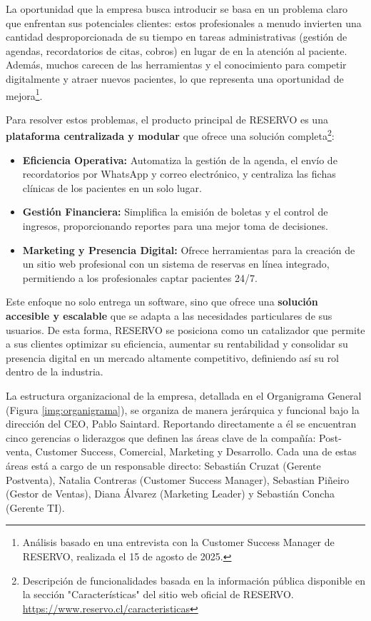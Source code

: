 La oportunidad que la empresa busca introducir se basa en un problema claro que enfrentan sus potenciales clientes: estos profesionales a menudo invierten una cantidad desproporcionada de su tiempo en tareas administrativas (gestión de agendas, recordatorios de citas, cobros) en lugar de en la atención al paciente. Además, muchos carecen de las herramientas y el conocimiento para competir digitalmente y atraer nuevos pacientes, lo que representa una oportunidad de mejora\footnote{Análisis basado en una entrevista con la Customer Success Manager de RESERVO, realizada el 15 de agosto de 2025.}.

Para resolver estos problemas, el producto principal de RESERVO es una \textbf{plataforma centralizada y modular} que ofrece una solución completa\footnote{Descripción de funcionalidades basada en la información pública disponible en la sección "Características" del sitio web oficial de RESERVO. \url{https://www.reservo.cl/caracteristicas}}:

\begin{itemize}
    \item \textbf{Eficiencia Operativa:} Automatiza la gestión de la agenda, el envío de recordatorios por WhatsApp y correo electrónico, y centraliza las fichas clínicas de los pacientes en un solo lugar.
    
    \item \textbf{Gestión Financiera:} Simplifica la emisión de boletas y el control de ingresos, proporcionando reportes para una mejor toma de decisiones.
    
    \item \textbf{Marketing y Presencia Digital:} Ofrece herramientas para la creación de un sitio web profesional con un sistema de reservas en línea integrado, permitiendo a los profesionales captar pacientes 24/7.
\end{itemize}

Este enfoque no solo entrega un software, sino que ofrece una \textbf{solución accesible y escalable} que se adapta a las necesidades particulares de sus usuarios. De esta forma, RESERVO se posiciona como un catalizador que permite a sus clientes optimizar su eficiencia, aumentar su rentabilidad y consolidar su presencia digital en un mercado altamente competitivo, definiendo así su rol dentro de la industria.

La estructura organizacional de la empresa, detallada en el Organigrama General (Figura \ref{img:organigrama}), se organiza de manera jerárquica y funcional bajo la dirección del CEO, Pablo Saintard. Reportando directamente a él se encuentran cinco gerencias o liderazgos que definen las áreas clave de la compañía: Post-venta, Customer Success, Comercial, Marketing y Desarrollo. Cada una de estas áreas está a cargo de un responsable directo: Sebastián Cruzat (Gerente Postventa), Natalia Contreras (Customer Success Manager), Sebastian Piñeiro (Gestor de Ventas), Diana Álvarez (Marketing Leader) y Sebastián Concha (Gerente TI).

